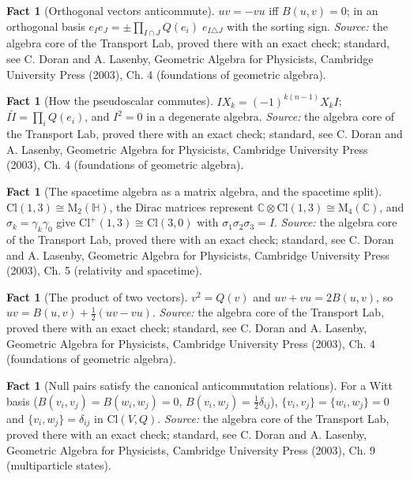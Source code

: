 \documentclass[11pt]{article}
\theoremstyle{definition}
\newtheorem{fact}[theorem]{Fact}
\theoremstyle{plain}
\providecommand{\C}{}\renewcommand{\C}{\mathbb{C}}
\providecommand{\Cl}{}\renewcommand{\Cl}{\mathrm{Cl}}
\providecommand{\HH}{}\renewcommand{\HH}{\mathbb{H}}
\providecommand{\Mat}{}\renewcommand{\Mat}{\mathrm{M}}
\begin{document}
\begin{fact}[Orthogonal vectors anticommute]\label{c:std-algebra.orthogonal-anticommute}
$uv = -vu$ iff $B(u,v) = 0$; in an orthogonal basis $e_I e_J = \pm \prod_{I \cap J} Q(e_i)\; e_{I \triangle J}$ with the sorting sign.
\emph{Source:} the algebra core of the Transport Lab, proved there with an exact check; standard, see C. Doran and A. Lasenby, Geometric Algebra for Physicists, Cambridge University Press (2003), Ch. 4 (foundations of geometric algebra).
\end{fact}

\begin{fact}[How the pseudoscalar commutes]\label{c:std-algebra.pseudoscalar-commutation}
$I X_k = (-1)^{k(n-1)} X_k I$; $I\tilde{I} = \prod_i Q(e_i)$, and $I^{2} = 0$ in a degenerate algebra.
\emph{Source:} the algebra core of the Transport Lab, proved there with an exact check; standard, see C. Doran and A. Lasenby, Geometric Algebra for Physicists, Cambridge University Press (2003), Ch. 4 (foundations of geometric algebra).
\end{fact}

\begin{fact}[The spacetime algebra as a matrix algebra, and the spacetime split]\label{c:std-algebra.sta-matrix}
$\Cl(1,3) \cong \Mat_2(\HH)$, the Dirac matrices represent $\C \otimes \Cl(1,3) \cong \Mat_4(\C)$, and $\sigma_k = \gamma_k\gamma_0$ give $\Cl^{+}(1,3) \cong \Cl(3,0)$ with $\sigma_1\sigma_2\sigma_3 = I$.
\emph{Source:} the algebra core of the Transport Lab, proved there with an exact check; standard, see C. Doran and A. Lasenby, Geometric Algebra for Physicists, Cambridge University Press (2003), Ch. 5 (relativity and spacetime).
\end{fact}

\begin{fact}[The product of two vectors]\label{c:std-algebra.vector-squares}
$v^{2} = Q(v)$ and $uv + vu = 2B(u, v)$, so $uv = B(u, v) + \tfrac12(uv - vu)$.
\emph{Source:} the algebra core of the Transport Lab, proved there with an exact check; standard, see C. Doran and A. Lasenby, Geometric Algebra for Physicists, Cambridge University Press (2003), Ch. 4 (foundations of geometric algebra).
\end{fact}

\begin{fact}[Null pairs satisfy the canonical anticommutation relations]\label{c:std-algebra.witt-basis-car}
For a Witt basis ($B(v_i,v_j) = B(w_i,w_j) = 0$, $B(v_i,w_j) = \tfrac12\delta_{ij}$), $\{v_i,v_j\} = \{w_i,w_j\} = 0$ and $\{v_i,w_j\} = \delta_{ij}$ in $\Cl(V,Q)$.
\emph{Source:} the algebra core of the Transport Lab, proved there with an exact check; standard, see C. Doran and A. Lasenby, Geometric Algebra for Physicists, Cambridge University Press (2003), Ch. 9 (multiparticle states).
\end{fact}
\end{document}
